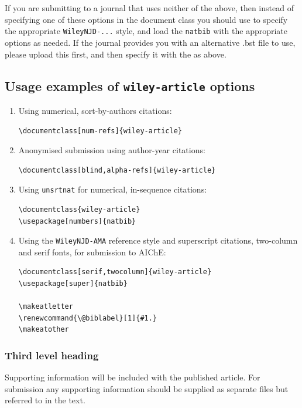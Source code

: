 \documentclass{wiley-article} %
\begin{document}
If you are submitting to a journal that uses neither of the above, then instead of specifying one of these options in the document class you should use  \verb|| to specify the appropriate \verb|WileyNJD-...| style, and load the \verb|natbib| with the appropriate options as needed. If the journal provides you with an alternative .bst file to use, please upload this first, and then specify it with the \verb|| as above.

\subsection{Usage examples of \texttt{wiley-article} options}

\begin{enumerate}
\item Using numerical, sort-by-authors citations:
\begin{verbatim}
\documentclass[num-refs]{wiley-article}
\end{verbatim}

\item Anonymised submission using author-year citations:
\begin{verbatim}
\documentclass[blind,alpha-refs]{wiley-article}
\end{verbatim}

\item Using \texttt{unsrtnat} for numerical, in-sequence citations:
\begin{verbatim}
\documentclass{wiley-article}
\usepackage[numbers]{natbib}

\end{verbatim}

\item Using the \texttt{WileyNJD-AMA} reference style and superscript citations, two-column and serif fonts, for submission to AIChE:

\begin{verbatim}
\documentclass[serif,twocolumn]{wiley-article}
\usepackage[super]{natbib}

\makeatletter
\renewcommand{\@biblabel}[1]{#1.}
\makeatother
\end{verbatim}

\end{enumerate}

\subsubsection{Third level heading}
Supporting information will be included with the published article. For submission any supporting information should be supplied as separate files but referred to in the text. 
\end{document}
